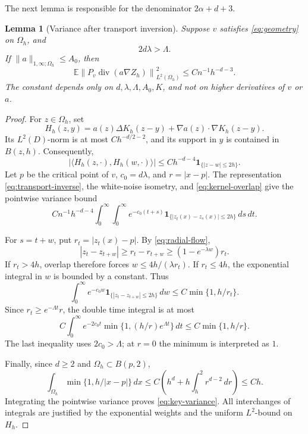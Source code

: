 \documentclass[11pt]{article}
\newtheorem{lemma}[theorem]{Lemma}
\theoremstyle{remark}
\newcommand{\E}{\mathbb E}
\newcommand{\one}{\mathbf 1}
\DeclareMathOperator{\divergence}{div}
\begin{document}
The next lemma is responsible for the denominator \(2\alpha+d+3\).

\begin{lemma}[Variance after transport inversion]\label{lem:variance}
Suppose \(v\) satisfies \eqref{eq:geometry} on \(\Omega_h\), and
\[
2d\lambda>\Lambda.
\]
If \(\|a\|_{1,\infty;\Omega_h}\leq A_0\), then
\begin{equation}\label{eq:key-variance}
\E\left\|P_v\divergence(a\nabla Z_h)\right\|_{L^2(\Omega_h)}^2
\leq Cn^{-1}h^{-d-3}.
\end{equation}
The constant depends only on \(d,\lambda,\Lambda,A_0,K\), and not
on higher derivatives of \(v\) or \(a\).
\end{lemma}

\begin{proof}
For \(z\in\Omega_h\), set
\[
H_h(z,y)=a(z)\Delta K_h(z-y)+\nabla a(z)\cdot\nabla K_h(z-y).
\]
Its \(L^2(D)\)-norm is at most \(Ch^{-d/2-2}\), and its support
in \(y\) is contained in \(B(z,h)\). Consequently,
\begin{equation}\label{eq:kernel-overlap}
|\langle H_h(z,\cdot),H_h(w,\cdot)\rangle|
\leq Ch^{-d-4}\one_{\{|z-w|\leq2h\}}.
\end{equation}
Let \(p\) be the critical point of \(v\), \(c_0=d\lambda\), and
\(r=|x-p|\). The representation \eqref{eq:transport-inverse},
the white-noise isometry, and \eqref{eq:kernel-overlap} give the
pointwise variance bound
\[
Cn^{-1}h^{-d-4}
\int_0^\infty\int_0^\infty
e^{-c_0(t+s)}
\one_{\{|z_t(x)-z_s(x)|\leq2h\}}\,ds\,dt.
\]

For \(s=t+w\), put \(r_t=|z_t(x)-p|\).
By \eqref{eq:radial-flow}, 
\[
|z_t-z_{t+w}|
\geq r_t-r_{t+w}
\geq (1-e^{-\lambda w})r_t.
\]
If \(r_t>4h\), overlap therefore forces
\(w\leq4h/(\lambda r_t)\). If \(r_t\leq4h\), the exponential
integral in \(w\) is bounded by a constant. Thus
\[
\int_0^\infty e^{-c_0w}
\one_{\{|z_t-z_{t+w}|\leq2h\}}\,dw
\leq C\min\{1,h/r_t\}.
\]
Since \(r_t\geq e^{-\Lambda t}r\), the double time integral is at most
\[
C\int_0^\infty e^{-2c_0t}
\min\{1,(h/r)e^{\Lambda t}\}\,dt
\leq C\min\{1,h/r\}.
\]
The last inequality uses \(2c_0>\Lambda\); at \(r=0\) the minimum
is interpreted as \(1\).

Finally, since \(d\geq2\) and \(\Omega_h\subset B(p,2)\),
\[
\int_{\Omega_h}\min\{1,h/|x-p|\}\,dx
\leq C\left(h^d+h\int_h^2 r^{d-2}\,dr\right)
\leq Ch.
\]
Integrating the pointwise variance proves \eqref{eq:key-variance}.
All interchanges of integrals are justified by the exponential
weights and the uniform \(L^2\)-bound on \(H_h\).
\end{proof}
\end{document}
